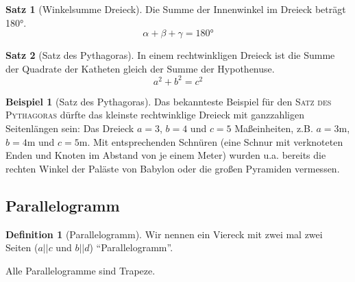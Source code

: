 \documentclass[a4paper]{book}%
\theoremstyle{definition}
\newtheorem{definition}{Definition}
\newtheorem{beispiel}{Beispiel}
\newtheorem{satz}{Satz}
\begin{document}
\begin{satz}[Winkelsumme Dreieck]
    Die Summe der Innenwinkel im Dreieck beträgt 180°.
    \begin{equation}\label{eqn:DreieckInnenwinkel}
        \alpha + \beta + \gamma = 180°
    \end{equation}
\end{satz}

\begin{satz}[Satz des Pythagoras]
    In einem rechtwinkligen Dreieck ist die Summe der Quadrate der Katheten gleich der Summe der  Hypothenuse.
    \begin{equation}\label{eqn:SatzDesPythagoras}
        a^2 + b^2 = c^2
    \end{equation}
\end{satz}

\begin{beispiel}[Satz des Pythagoras]
    Das bekannteste Beispiel für den \textsc{Satz des Pythagoras} dürfte das kleinste rechtwinklige Dreieck mit ganzzahligen Seitenlängen sein: Das Dreieck $a=3$, $b=4$ und $c=5$ Maßeinheiten, z.B. $a=3\text{m}$, $b=4\text{m}$ und $c=5\text{m}$. Mit entsprechenden Schnüren (eine Schnur mit verknoteten Enden und Knoten im Abstand von je einem Meter) wurden u.a. bereits die rechten Winkel der Paläste von Babylon oder die großen Pyramiden vermessen.
\end{beispiel}

\subsection{Parallelogramm}\label{Parallelogramm}

\begin{definition}[Parallelogramm]
    Wir nennen ein Viereck mit zwei mal zwei  Seiten ($a || c$ und $b || d$) \enquote{Parallelogramm}.
\end{definition}

Alle Parallelogramme sind Trapeze.
\end{document}
